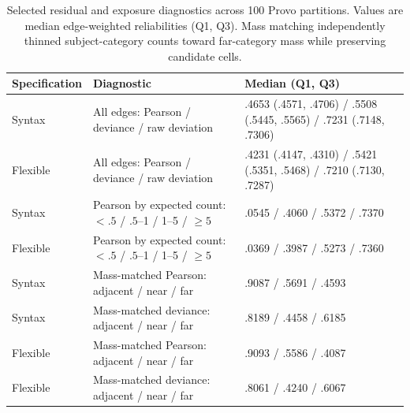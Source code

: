 \begin{table}[tbp]
\centering
\caption{Selected residual and exposure diagnostics across 100 Provo partitions. Values are median edge-weighted reliabilities (Q1, Q3). Mass matching independently thinned subject-category counts toward far-category mass while preserving candidate cells.}
\label{tab:s4-residual-diagnostics}
\small
\begin{tabularx}{\linewidth}{llY}
\toprule
Specification & Diagnostic & Median (Q1, Q3) \\
\midrule
Syntax & All edges: Pearson / deviance / raw deviation & .4653 (.4571, .4706) / .5508 (.5445, .5565) / .7231 (.7148, .7306) \\
Flexible & All edges: Pearson / deviance / raw deviation & .4231 (.4147, .4310) / .5421 (.5351, .5468) / .7210 (.7130, .7287) \\
Syntax & Pearson by expected count: $<.5$ / $.5$--1 / 1--5 / $\geq5$ & .0545 / .4060 / .5372 / .7370 \\
Flexible & Pearson by expected count: $<.5$ / $.5$--1 / 1--5 / $\geq5$ & .0369 / .3987 / .5273 / .7360 \\
Syntax & Mass-matched Pearson: adjacent / near / far & .9087 / .5691 / .4593 \\
Syntax & Mass-matched deviance: adjacent / near / far & .8189 / .4458 / .6185 \\
Flexible & Mass-matched Pearson: adjacent / near / far & .9093 / .5586 / .4087 \\
Flexible & Mass-matched deviance: adjacent / near / far & .8061 / .4240 / .6067 \\
\bottomrule
\end{tabularx}
\end{table}
